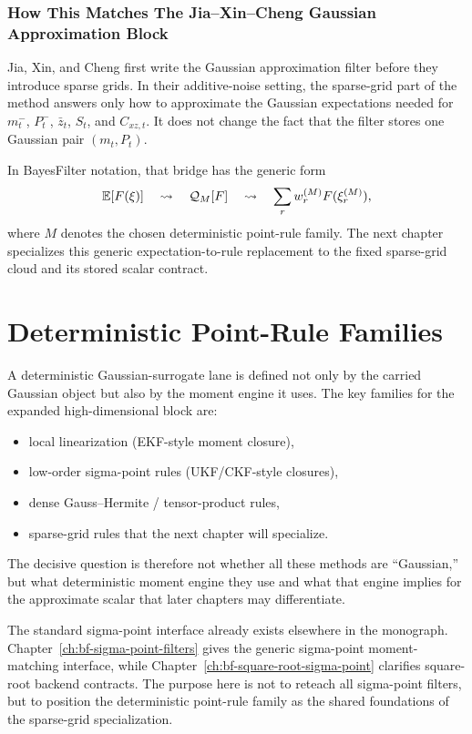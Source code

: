 \subsubsection{How This Matches The Jia--Xin--Cheng Gaussian Approximation Block}
\label{subsec:bf-hd-gq-jia-block}

Jia, Xin, and Cheng first write the Gaussian approximation filter before they
introduce sparse grids.  In their additive-noise setting, the sparse-grid part of
the method answers only how to approximate the Gaussian expectations needed for
\(m_t^-\), \(P_t^-\), \(\bar z_t\), \(S_t\), and \(C_{xz,t}\).  It does not
change the fact that the filter stores one Gaussian pair \((m_t,P_t)\).

In BayesFilter notation, that bridge has the generic form
\begin{equation}
  \mathbb{E}[F(\xi)]
  \quad\leadsto\quad
  \mathcal Q_M[F]
  \quad\leadsto\quad
  \sum_{r} w_r^{(M)} F(\xi_r^{(M)}),
  \label{eq:bf-hd-gq-expectation-to-rule}
\end{equation}
where \(M\) denotes the chosen deterministic point-rule family.  The next
chapter specializes this generic expectation-to-rule replacement to the fixed
sparse-grid cloud and its stored scalar contract.

\section{Deterministic Point-Rule Families}
\label{sec:bf-hd-gq-rule-families}

A deterministic Gaussian-surrogate lane is defined not only by the carried
Gaussian object but also by the moment engine it uses.  The key families for the
expanded high-dimensional block are:
\begin{itemize}[leftmargin=0.28in]
  \item local linearization (EKF-style moment closure),
  \item low-order sigma-point rules (UKF/CKF-style closures),
  \item dense Gauss--Hermite / tensor-product rules,
  \item sparse-grid rules that the next chapter will specialize.
\end{itemize}
The decisive question is therefore not whether all these methods are “Gaussian,”
but what deterministic moment engine they use and what that engine implies for
the approximate scalar that later chapters may differentiate.

The standard sigma-point interface already exists elsewhere in the monograph.
Chapter~\ref{ch:bf-sigma-point-filters} gives the generic sigma-point
moment-matching interface, while Chapter~\ref{ch:bf-square-root-sigma-point}
clarifies square-root backend contracts.  The purpose here is not to reteach all
sigma-point filters, but to position the deterministic point-rule family as the
shared foundations of the sparse-grid specialization.


